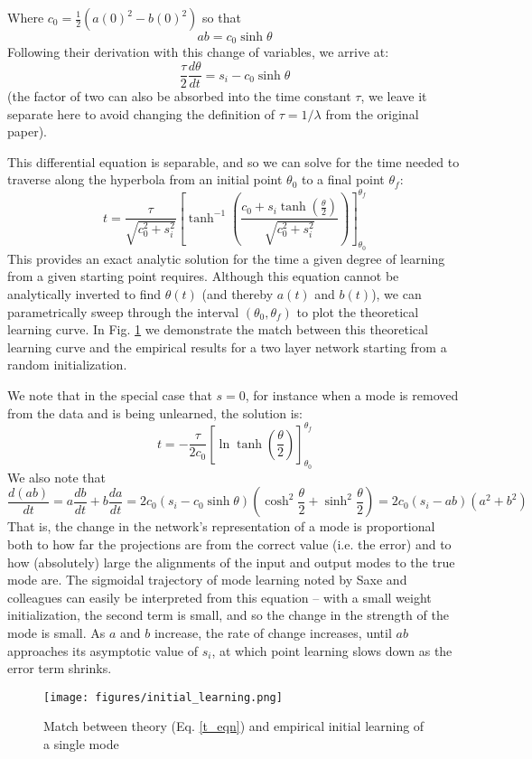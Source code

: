 \documentclass{article}
\begin{document}
Where $c_0 = \frac{1}{2} (a(0)^2-b(0)^2)$ so that
$$ab = c_0 \sinh \theta$$
Following their derivation with this change of variables, we arrive at:
$$\frac{\tau}{2} \frac{d\theta}{dt} = s_i - c_0 \sinh \theta$$
(the factor of two can also be absorbed into the time constant $\tau$, we leave it separate here to avoid changing the definition of $\tau = 1/\lambda$ from the original paper). \par
This differential equation is separable, and so we can solve for the time needed to traverse along the hyperbola from an initial point $\theta_0$ to a final point $\theta_f$:
\begin{equation} \label{t_eqn} 
t = \frac{\tau}{\sqrt{c_0^2 + s_i^2}} \left[\tanh^{-1} \left( \frac{c_0 + s_i \tanh\left( \frac{\theta}{2} \right)}{\sqrt{c_0^2+s_i^2}}\right)\right]_{\theta_0}^{\theta_f}
\end{equation}%
This provides an exact analytic solution for the time a given degree of learning from a given starting point requires. Although this equation cannot be analytically inverted to find $\theta(t)$ (and thereby $a(t)$ and $b(t)$), we can parametrically sweep through the interval $(\theta_0, \theta_f)$ to plot the theoretical learning curve. In Fig. \ref{init_fig} we demonstrate the match between this theoretical learning curve and the empirical results for a two layer network starting from a random initialization. \par
We note that in the special case that \(s = 0\), for instance when a mode is removed from the data and is being unlearned, the solution is:
\begin{equation} \label{t_eqn_s_zero} 
t = -\frac{\tau}{2c_0} \left[\ln \tanh \left(\frac{\theta}{2}\right)\right]_{\theta_0}^{\theta_f}
\end{equation}%
We also note that 
$$\frac{d(ab)}{dt} = a \frac{db}{dt} + b \frac{da}{dt} = 2 c_0 (s_i - c_0 \sinh \theta) \left( \cosh^2 \frac{\theta}{2} + \sinh^2 \frac{\theta}{2} \right) = 2 c_0 \left(s_i - ab\right) \left(a^2 + b^2 \right)$$
That is, the change in the network's representation of a mode is proportional both to how far the projections are from the correct value (i.e. the error) and to how (absolutely) large the alignments of the input and output modes to the true mode are. The sigmoidal trajectory of mode learning noted by Saxe and colleagues can easily be interpreted from this equation -- with a small weight initialization, the second term is small, and so the change in the strength of the mode is small. As $a$ and $b$ increase, the rate of change increases, until $ab$ approaches its asymptotic value of $s_i$, at which point learning slows down as the error term shrinks. \par
\begin{figure}
\centering
\texttt{[image: figures/initial\_learning.png]}
\caption{Match between theory (Eq. \ref{t_eqn}) and empirical initial learning of a single mode}
\label{init_fig}
\end{figure}
\end{document}
